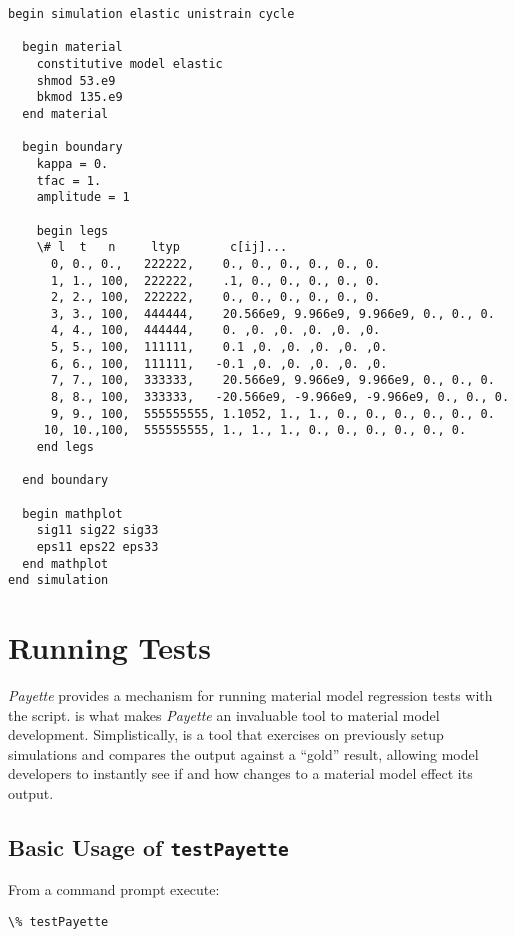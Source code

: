 \documentclass[letterpaper,10pt,english]{sphinxmanual}
\begin{document}
\begin{Verbatim}[commandchars=\\\{\}]
begin simulation elastic unistrain cycle

  begin material
    constitutive model elastic
    shmod 53.e9
    bkmod 135.e9
  end material

  begin boundary
    kappa = 0.
    tfac = 1.
    amplitude = 1

    begin legs
    \# l  t   n     ltyp       c[ij]...
      0, 0., 0.,   222222,    0., 0., 0., 0., 0., 0.
      1, 1., 100,  222222,    .1, 0., 0., 0., 0., 0.
      2, 2., 100,  222222,    0., 0., 0., 0., 0., 0.
      3, 3., 100,  444444,    20.566e9, 9.966e9, 9.966e9, 0., 0., 0.
      4, 4., 100,  444444,    0. ,0. ,0. ,0. ,0. ,0.
      5, 5., 100,  111111,    0.1 ,0. ,0. ,0. ,0. ,0.
      6, 6., 100,  111111,   -0.1 ,0. ,0. ,0. ,0. ,0.
      7, 7., 100,  333333,    20.566e9, 9.966e9, 9.966e9, 0., 0., 0.
      8, 8., 100,  333333,   -20.566e9, -9.966e9, -9.966e9, 0., 0., 0.
      9, 9., 100,  555555555, 1.1052, 1., 1., 0., 0., 0., 0., 0., 0.
     10, 10.,100,  555555555, 1., 1., 1., 0., 0., 0., 0., 0., 0.
    end legs

  end boundary

  begin mathplot
    sig11 sig22 sig33
    eps11 eps22 eps33
  end mathplot
end simulation
\end{Verbatim}


\chapter{Running Tests}
\label{Files/test_payette:running-tests}\label{Files/test_payette::doc}
\emph{Payette} provides a mechanism for running material model regression tests with
the  script.  is what makes \emph{Payette} an
invaluable tool to material model development. Simplistically,
 is a tool that exercises  on previously
setup simulations and compares the output against a ``gold'' result, allowing model
developers to instantly see if and how changes to a material model effect its
output.


\section{Basic Usage of \texttt{testPayette}}
\label{Files/test_payette:basic-usage-of-testpayette}
From a command prompt execute:

\begin{Verbatim}[commandchars=\\\{\}]
\% testPayette
\end{Verbatim}
\end{document}

